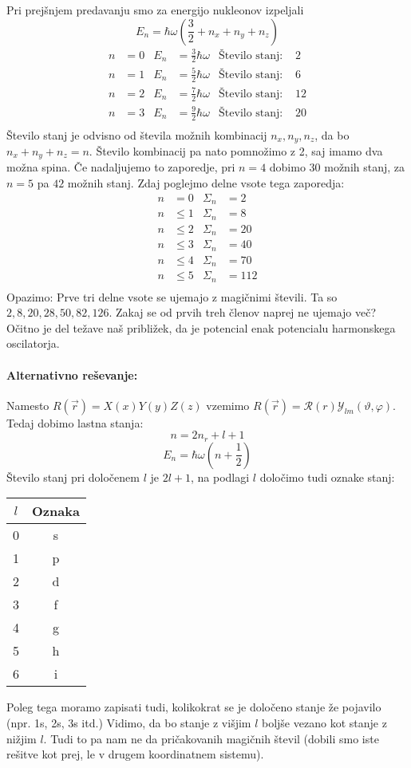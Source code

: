 \documentclass[a4paper]{article}
\newcommand{\vct}[1]{\overrightarrow{#1}}
\begin{document}
Pri prejšnjem predavanju smo za energijo nukleonov izpeljali
$$E_n = \hbar \omega (\frac{3}{2} + n_x + n_y + n_z)$$
\begin{align*}
    n & = 0 & E_n & = \frac{3}{2}\hbar\omega & \text{Število stanj: } & 2 \\
    n & = 1 & E_n & = \frac{5}{2}\hbar\omega & \text{Število stanj: } & 6 \\
    n & = 2 & E_n & = \frac{7}{2}\hbar\omega & \text{Število stanj: } & 12 \\
    n & = 3 & E_n & = \frac{9}{2}\hbar\omega & \text{Število stanj: } & 20 \\
\end{align*}
Število stanj je odvisno od števila možnih kombinacij $n_x, n_y, n_z$, da bo $n_x + n_y + n_z = n$. Število kombinacij pa nato pomnožimo z 2, saj imamo dva možna spina.
Če nadaljujemo to zaporedje, pri $n=4$ dobimo $30$ možnih stanj, za $n = 5$ pa $42$ možnih stanj.
Zdaj poglejmo delne vsote tega zaporedja:
\begin{align*}
    n & = 0 & \Sigma_n & = 2 \\
    n & \leq 1 & \Sigma_n & = 8 \\
    n & \leq 2 & \Sigma_n & = 20 \\
    n & \leq 3 & \Sigma_n & = 40 \\
    n & \leq 4 & \Sigma_n & = 70 \\
    n & \leq 5 & \Sigma_n & = 112 \\
\end{align*}
Opazimo: Prve tri delne vsote se ujemajo z magičnimi števili. Ta so $2, 8, 20, 28, 50, 82, 126$. Zakaj se od prvih treh členov naprej ne ujemajo več? Očitno je del težave naš približek,
da je potencial enak potencialu harmonskega oscilatorja.
\paragraph{Alternativno reševanje:} Namesto $R(\vct{r}) = X(x)Y(y)Z(z)$ vzemimo $R(\vct{r}) = \mathcal{R}(r)\mathcal{Y}_{lm}(\vartheta, \varphi)$.
Tedaj dobimo lastna stanja:
$$n = 2n_r + l + 1$$
$$E_n = \hbar\omega\left(n + \frac{1}{2}\right)$$
Število stanj pri določenem $l$ je $2l + 1$, na podlagi $l$ določimo tudi oznake stanj:
\begin{table}[h!]
    \centering
    \begin{tabular}{c|c}
        $l$ & Oznaka \\
        \hline
        0 & s \\
        1 & p \\
        2 & d \\
        3 & f \\
        4 & g \\
        5 & h \\
        6 & i \\
    \end{tabular}
\end{table}
Poleg tega moramo zapisati tudi, kolikokrat se je določeno stanje že pojavilo (npr. 1s, 2s, 3s itd.) Vidimo, da bo stanje z višjim $l$ boljše vezano kot stanje z nižjim $l$.
Tudi to pa nam ne da pričakovanih magičnih števil (dobili smo iste rešitve kot prej, le v drugem koordinatnem sistemu).
\end{document}
